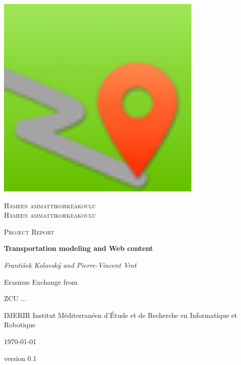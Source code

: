\documentclass[12pt, a4paper, final]{report}
\begin{document}

\begin{titlepage}

    \centering
    
    \includegraphics[width=0.75\textwidth]{./img/c00-main/logo.png}
    \par\vspace{1cm}
    {\scshape Hämeen ammattikorkeakoulu \\Hämeen ammattikorkeakoulu \par}
    \vspace{1cm}
    
    {\scshape\Large Project Report\par}
    \vspace{1.5cm}
    
    {\huge\bfseries Transportation modeling and Web content\par}
    \vspace{2cm}
    
    {\Large\itshape František Kolovský and Pierre-Vincent Vrot\par}
    \vfill
    
    Erasmus Exchange from \par
    \textsc{ZCU} ... \par
    \textsc{IMERIR} Institut Méditerranéen d’Étude et de Recherche en Informatique et Robotique \par

    \vfill
    
    {\large \today  \par version 0.1 \par}
    
\end{titlepage}
\end{document}
